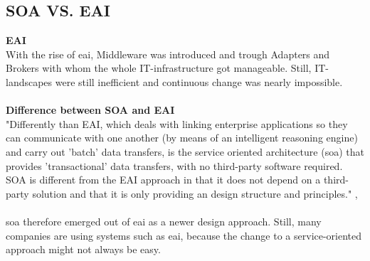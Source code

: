 \documentclass[12pt]{article}
\begin{document}
\subsection{SOA VS. EAI}
\textbf{EAI}\\
With the rise of \gls{eai}, Middleware was introduced and trough Adapters and Brokers with whom the whole IT-infrastructure got manageable. Still, IT-landscapes were still inefficient and continuous change was nearly impossible.\cite[page 115]{te}
\\
\\\textbf{Difference between SOA and EAI}\\
"Differently than EAI, which deals with linking enterprise applications so they can communicate with one another (by means of an intelligent reasoning engine) and carry out 'batch' data transfers, is the service oriented architecture (\gls{soa}) that provides 'transactional' data transfers, with no third-party software required. SOA is different from the EAI approach in that it does not depend on a third-party solution and that it is only providing an design structure and principles." ,\cite{soadef}\\
\\
\gls{soa} therefore emerged out of \gls{eai} as a newer design approach. Still, many companies are using systems such as \gls{eai}, because the change to a service-oriented approach might not always be easy. 
\end{document}
